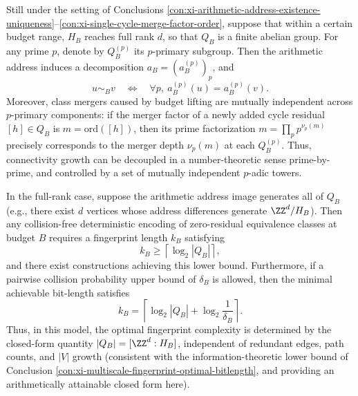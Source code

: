 \begin{conclusion}\label{con:xi-prime-decomposition-independence}
Still under the setting of Conclusions \ref{con:xi-arithmetic-address-existence-uniqueness}--\ref{con:xi-single-cycle-merge-factor-order}, suppose that within a certain budget range, \(H_B\) reaches full rank \(d\), so that \(Q_B\) is a finite abelian group.
For any prime \(p\), denote by \(Q_B^{(p)}\) its \(p\)-primary subgroup.
Then the arithmetic address induces a decomposition \(a_B=(a_B^{(p)})_p\), and
\[
u\sim_B v\quad\Longleftrightarrow\quad
\forall p,\ a_B^{(p)}(u)=a_B^{(p)}(v).
\]
Moreover, class mergers caused by budget lifting are mutually independent across \(p\)-primary components: if the merger factor of a newly added cycle residual \([h]\in Q_B\) is \(m=\mathrm{ord}([h])\), then its prime factorization
\(
m=\prod_p p^{\nu_p(m)}
\)
precisely corresponds to the merger depth \(\nu_p(m)\) at each \(Q_B^{(p)}\).
Thus, connectivity growth can be decoupled in a number-theoretic sense prime-by-prime, and controlled by a set of mutually independent \(p\)-adic towers.
\end{conclusion}

\begin{conclusion}\label{con:xi-optimal-fingerprint-bitlength-arithmetic-closed-form}
In the full-rank case, suppose the arithmetic address image generates all of \(Q_B\) (e.g., there exist \(d\) vertices whose address differences generate \(\ZZ^d/H_B\)).
Then any collision-free deterministic encoding of zero-residual equivalence classes at budget \(B\) requires a fingerprint length \(k_B\) satisfying
\[
k_B\ge \left\lceil\log_2|Q_B|\right\rceil,
\]
and there exist constructions achieving this lower bound.
Furthermore, if a pairwise collision probability upper bound of \(\delta_B\) is allowed, then the minimal achievable bit-length satisfies
\[
k_B=\left\lceil\log_2|Q_B|+\log_2\frac1{\delta_B}\right\rceil.
\]
Thus, in this model, the optimal fingerprint complexity is determined by the closed-form quantity
\(
|Q_B|=[\ZZ^d:H_B]
\),
independent of redundant edges, path counts, and \(|V|\) growth (consistent with the information-theoretic lower bound of Conclusion \ref{con:xi-multiscale-fingerprint-optimal-bitlength}, and providing an arithmetically attainable closed form here).
\end{conclusion}

